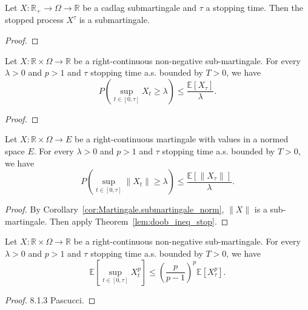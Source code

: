 \begin{lemma}\label{lem:Submartingale.stoppedProcess_of_cadlag}
  Let $X:\mathbb{R}_+ \to \Omega \to \mathbb{R}$ be a cadlag submartingale and $\tau$ a stopping time.
  Then the stopped process $X^\tau$ is a submartingale.
\end{lemma}

\begin{proof}

\end{proof}

\begin{lemma}\label{lem:doob_ineq_stop}
  Let $X:\mathbb{R}\times\Omega\rightarrow \mathbb{R}$ be a right-continuous non-negative sub-martingale.
  For every $\lambda>0$ and $p>1$ and $\tau$ stopping time a.s. bounded by $T>0$, we have
  $$
  P\left( \sup_{t\in[0,\tau]}X_t\geq\lambda \right)\leq \frac{\mathbb{E}[X_\tau]}{\lambda}.
  $$
\end{lemma}
\begin{proof}

\end{proof}

\begin{corollary}\label{cor:doob_ineq_stop}
  Let $X:\mathbb{R}\times\Omega\rightarrow E$ be a right-continuous martingale with values in a normed space $E$.
  For every $\lambda>0$ and $p>1$ and $\tau$ stopping time a.s. bounded by $T>0$, we have
  $$
  P\left( \sup_{t\in[0,\tau]}\lVert X_t \rVert \geq\lambda \right)\leq \frac{\mathbb{E}[\lVert X_\tau \rVert]}{\lambda}.
  $$
\end{corollary}
\begin{proof}
  By Corollary~\ref{cor:Martingale.submartingale_norm}, $\lVert X \rVert$ is a sub-martingale.
  Then apply Theorem~\ref{lem:doob_ineq_stop}.
\end{proof}

\begin{lemma}\label{lem:doob_ineq_stop_exp_val}
  Let $X:\mathbb{R}\times\Omega\rightarrow \mathbb{R}$ be a right-continuous non-negative sub-martingale.
  For every $\lambda>0$ and $p>1$ and $\tau$ stopping time a.s. bounded by $T>0$, we have
  $$
  \mathbb{E}\left[ \sup_{t\in[0,\tau]}X_t^p \right]\leq \left(\frac{p}{p-1}\right)^p\mathbb{E}[X_\tau^p].
  $$
\end{lemma}
\begin{proof}
  8.1.3 Pascucci.
\end{proof}

